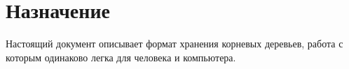 \section{Назначение}
Настоящий документ описывает формат хранения корневых деревьев, работа с которым одинаково легка для человека и компьютера.
